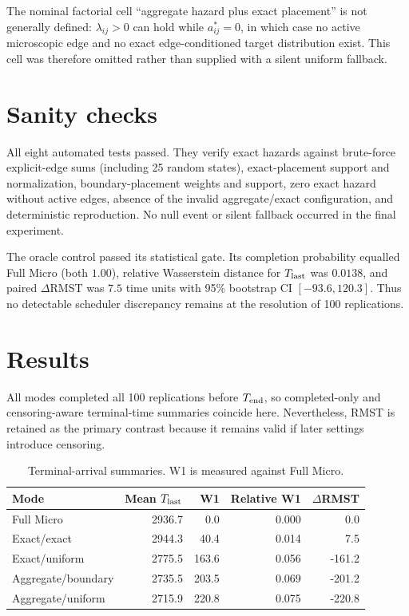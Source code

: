 \documentclass[11pt]{article}
\begin{document}
The nominal factorial cell ``aggregate hazard plus exact placement'' is not generally defined: $\lambda_{ij}>0$ can hold while $a^*_{ij}=0$, in which case no active microscopic edge and no exact edge-conditioned target distribution exist. This cell was therefore omitted rather than supplied with a silent uniform fallback.

\section{Sanity checks}
All eight automated tests passed. They verify exact hazards against brute-force explicit-edge sums (including 25 random states), exact-placement support and normalization, boundary-placement weights and support, zero exact hazard without active edges, absence of the invalid aggregate/exact configuration, and deterministic reproduction. No null event or silent fallback occurred in the final experiment.

The oracle control passed its statistical gate. Its completion probability equalled Full Micro (both $1.00$), relative Wasserstein distance for $T_{\rm last}$ was $0.0138$, and paired $\Delta$RMST was $7.5$ time units with 95\% bootstrap CI $[-93.6,120.3]$. Thus no detectable scheduler discrepancy remains at the resolution of 100 replications.

\section{Results}
All modes completed all 100 replications before $T_{\rm end}$, so completed-only and censoring-aware terminal-time summaries coincide here. Nevertheless, RMST is retained as the primary contrast because it remains valid if later settings introduce censoring.

\begin{table}[ht]
\centering
\small
\begin{tabular}{lrrrr}
\toprule
Mode & Mean $T_{\rm last}$ & W1 & Relative W1 & $\Delta$RMST \\
\midrule
Full Micro & 2936.7 & 0.0 & 0.000 & 0.0 \\
Exact/exact & 2944.3 & 40.4 & 0.014 & 7.5 \\
Exact/uniform & 2775.5 & 163.6 & 0.056 & -161.2 \\
Aggregate/boundary & 2735.5 & 203.5 & 0.069 & -201.2 \\
Aggregate/uniform & 2715.9 & 220.8 & 0.075 & -220.8 \\
\bottomrule
\end{tabular}
\caption{Terminal-arrival summaries. W1 is measured against Full Micro.}
\end{table}
\end{document}
